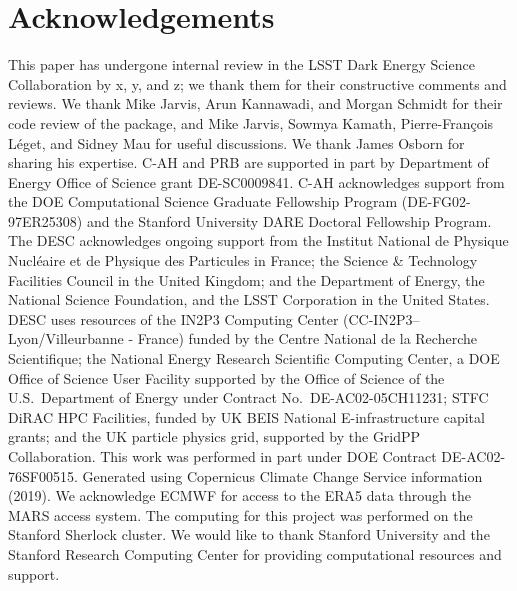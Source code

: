\documentclass[twocolumn]{aastex631}
\begin{document}
\section*{Acknowledgements} 
This paper has undergone internal review in the LSST Dark Energy Science Collaboration by x, y, and z; we thank them for their constructive comments and reviews. 
We thank Mike Jarvis, Arun Kannawadi, and Morgan Schmidt for their code review of the \psfws package, and Mike Jarvis, Sowmya Kamath, Pierre-François L\'eget, and Sidney Mau for useful discussions.
We thank James Osborn for sharing his expertise.
C-AH and PRB are supported in part by Department of Energy Office of Science grant DE-SC0009841.
C-AH acknowledges support from the DOE Computational Science Graduate Fellowship Program (DE-FG02-97ER25308) and the Stanford University DARE Doctoral Fellowship Program. 
The DESC acknowledges ongoing support from the Institut National de Physique Nucl\'eaire et de Physique des Particules in France; the Science \& Technology Facilities Council in the United Kingdom; and the Department of Energy, the National Science Foundation, and the LSST  Corporation in the United States.  
DESC uses resources of the IN2P3  Computing Center (CC-IN2P3--Lyon/Villeurbanne - France) funded by the Centre National de la Recherche Scientifique; the National Energy Research Scientific Computing Center, a DOE Office of Science User Facility supported by the Office of Science of the U.S.\ Department of Energy under Contract No.\ DE-AC02-05CH11231; STFC DiRAC HPC Facilities, funded by UK BEIS National E-infrastructure capital grants; and the UK particle physics grid, supported by the GridPP Collaboration.  
This work was performed in part under DOE Contract DE-AC02-76SF00515.
Generated using Copernicus Climate Change Service information (2019). 
We acknowledge ECMWF for access to the ERA5 data through the MARS access system.
The computing for this project was performed on the Stanford Sherlock cluster.
We would like to thank Stanford University and the Stanford Research Computing Center for providing computational resources and support. 
\end{document}
